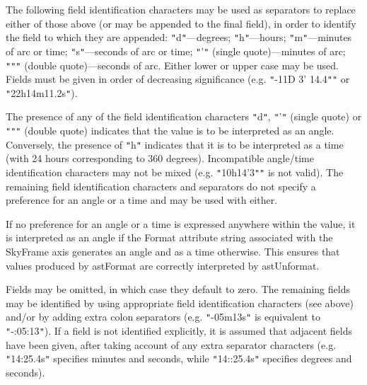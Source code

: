 \documentclass[twoside,11pt]{article}
\begin{document}
{{{         \sstitem
         The following field identification characters may be used as
         separators to replace either of those above (or may be appended
         to the final field), in order to identify the field to which
         they are appended: {\tt{"}}d{\tt{"}}---degrees; {\tt{"}}h{\tt{"}}---hours; {\tt{"}}m{\tt{"}}---minutes of
         arc or time; {\tt{"}}s{\tt{"}}---seconds of arc or time; {\tt{"}}'{\tt{"}} (single
         quote)---minutes of arc; {\tt{"}}{\tt{"}}{\tt{"}} (double quote)---seconds of arc.
         Either lower or upper case may be used.  Fields must be given in
         order of decreasing significance (e.g. {\tt{"}}-11D 3' 14.4{\tt{"}}{\tt{"}} or
         {\tt{"}}22h14m11.2s{\tt{"}}).

         \sstitem
         The presence of any of the field identification characters
         {\tt{"}}d{\tt{"}}, {\tt{"}}'{\tt{"}} (single quote) or {\tt{"}}{\tt{"}}{\tt{"}} (double quote) indicates that the
         value is to be interpreted as an angle. Conversely, the presence
         of {\tt{"}}h{\tt{"}} indicates that it is to be interpreted as a time (with 24
         hours corresponding to 360 degrees). Incompatible angle/time
         identification characters may not be mixed (e.g. {\tt{"}}10h14'3{\tt{"}}{\tt{"}} is
         not valid).  The remaining field identification characters and
         separators do not specify a preference for an angle or a time
         and may be used with either.

         \sstitem
         If no preference for an angle or a time is expressed anywhere
         within the value, it is interpreted as an angle if the Format
         attribute string associated with the SkyFrame axis generates an
         angle and as a time otherwise. This ensures that values produced
         by astFormat are correctly interpreted by astUnformat.

         \sstitem
         Fields may be omitted, in which case they default to zero. The
         remaining fields may be identified by using appropriate field
         identification characters (see above) and/or by adding extra
         colon separators (e.g. {\tt{"}}-05m13s{\tt{"}} is equivalent to {\tt{"}}-:05:13{\tt{"}}). If
         a field is not identified explicitly, it is assumed that
         adjacent fields have been given, after taking account of any
         extra separator characters (e.g. {\tt{"}}14:25.4s{\tt{"}} specifies minutes
         and seconds, while {\tt{"}}14::25.4s{\tt{"}} specifies degrees and seconds).

}}}
\end{document}
